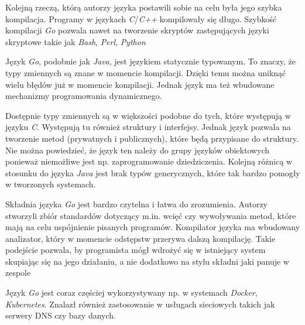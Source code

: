 Kolejną rzeczą, którą autorzy języka postawili sobie na celu była jego szybka kompilacja. Programy w językach \textsl{C}/\textsl{C++} kompilowały się długo. Szybkość kompilacji \textsl{Go} pozwala nawet na tworzenie skryptów zastępujących języki skryptowe takie jak \textsl{Bash}, \textsl{Perl}, \textsl{Python}

Język \textsl{Go}, podobnie jak \textsl{Java}, jest językiem statycznie typowanym. To znaczy, że typy zmiennych są znane w momencie kompilacji. Dzięki temu można uniknąć wielu błędów już w momencie kompilacji. Jednak język ma też wbudowane mechanizmy programowania dynamicznego. 

Dostępnie typy zmiennych są w większości podobne do tych, które występują w języku \textsl{C}. Występują tu również struktury i interfejsy. Jednak język pozwala na tworzenie metod (prywatnych i publicznych), które będą przypisane do struktury. Nie można powiedzieć, że język ten należy do grupy języków obiektowych ponieważ niemożliwe jest np. zaprogramowanie dziedziczenia. Kolejną różnicą w stosunku do języka \textsl{Java} jest brak typów generycznych, które tak bardzo pomogły w tworzonych systemach.
 
Składnia języka \textsl{Go} jest bardzo czytelna i łatwa do zrozumienia. Autorzy stworzyli zbiór standardów dotyczący m.in. wcięć czy wywoływania metod, które mają na celu uspójnienie pisanych programów. Kompilator języka ma wbudowany analizator, który w momencie odstępstw przerywa dalszą kompilację. Takie podejście pozwala, by programista mógł wdrożyć się w istniejący system skupiając się na jego działaniu, a nie dodatkowo na stylu składni jaki panuje w zespole

Język \textsl{Go} jest coraz częściej wykorzystywany np. w systemach  \textsl{Docker}, \textsl{Kubernetes}. Znalazł również zastosowanie w usługach sieciowych takich jak serwery DNS czy bazy danych.